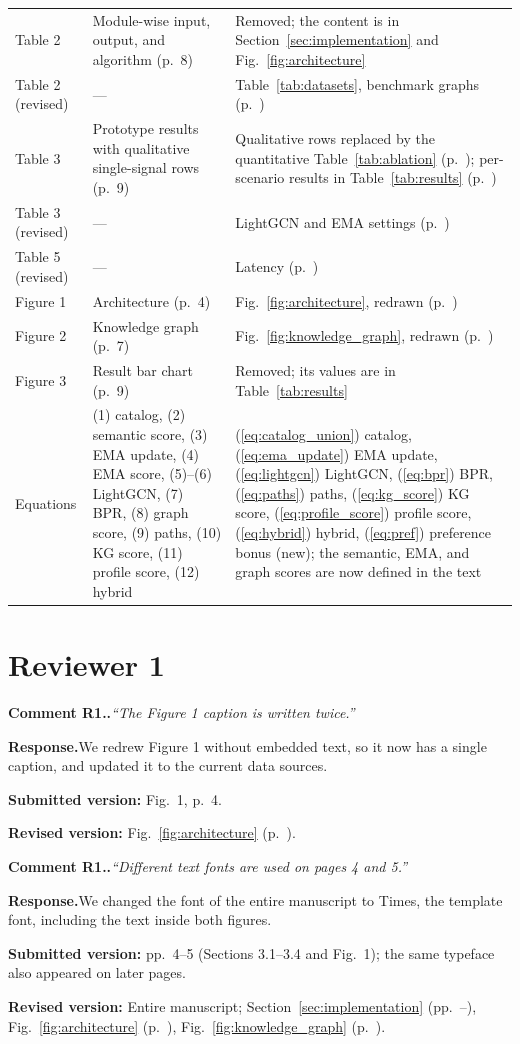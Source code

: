 \documentclass[10pt]{article}
\newcounter{rc}
\newcommand{\reviewer}[1]{\setcounter{rc}{0}\section*{Reviewer #1}}
\newcommand{\point}[2]{\stepcounter{rc}%
  \par\medskip\noindent\textbf{Comment #1.\arabic{rc}.}\enspace\textit{``#2''}\par}
\newcommand{\response}{\noindent\textbf{Response.}\enspace}
\newcommand{\where}[2]{\par\noindent\textbf{Submitted version:} #1\par\noindent\textbf{Revised version:} #2\par}
\newcommand{\figr}[1]{Fig.~\ref{#1} (p.~\pageref{#1})}
\newcommand{\sn}[1]{\ref{#1}}
\newcommand{\pg}[1]{p.~\pageref{#1}}
\begin{document}
{\begin{longtable}{@{}p{3.1cm}p{5.4cm}p{7.3cm}@{}}
Table 2 & Module-wise input, output, and algorithm (p.~8) & Removed; the content is in Section~\sn{sec:implementation} and Fig.~\ref{fig:architecture} \\
Table 2 (revised) & --- & Table~\ref{tab:datasets}, benchmark graphs (\pg{tab:datasets}) \\
Table 3 & Prototype results with qualitative single-signal rows (p.~9) & Qualitative rows replaced by the quantitative Table~\ref{tab:ablation} (\pg{tab:ablation}); per-scenario results in Table~\ref{tab:results} (\pg{tab:results}) \\
Table 3 (revised) & --- & LightGCN and EMA settings (\pg{tab:settings}) \\
Table 5 (revised) & --- & Latency (\pg{tab:latency}) \\
\midrule
Figure 1 & Architecture (p.~4) & Fig.~\ref{fig:architecture}, redrawn (\pg{fig:architecture}) \\
Figure 2 & Knowledge graph (p.~7) & Fig.~\ref{fig:knowledge_graph}, redrawn (\pg{fig:knowledge_graph}) \\
Figure 3 & Result bar chart (p.~9) & Removed; its values are in Table~\ref{tab:results} \\
\midrule
Equations & (1) catalog, (2) semantic score, (3) EMA update, (4) EMA score, (5)--(6) LightGCN, (7) BPR, (8) graph score, (9) paths, (10) KG score, (11) profile score, (12) hybrid & (\ref{eq:catalog_union}) catalog, (\ref{eq:ema_update}) EMA update, (\ref{eq:lightgcn}) LightGCN, (\ref{eq:bpr}) BPR, (\ref{eq:paths}) paths, (\ref{eq:kg_score}) KG score, (\ref{eq:profile_score}) profile score, (\ref{eq:hybrid}) hybrid, (\ref{eq:pref}) preference bonus (new); the semantic, EMA, and graph scores are now defined in the text \\
\bottomrule
\end{longtable}
}

\reviewer{1}

\point{R1}{The Figure 1 caption is written twice.}
\response We redrew Figure 1 without embedded text, so it now has a single caption, and updated it to the current data sources.
\where{Fig.~1, p.~4.}{\figr{fig:architecture}.}

\point{R1}{Different text fonts are used on pages 4 and 5.}
\response We changed the font of the entire manuscript to Times, the template font, including the text inside both figures.
\where{pp.~4--5 (Sections 3.1--3.4 and Fig.~1); the same typeface also appeared on later pages.}{Entire manuscript; Section~\ref{sec:implementation} (pp.~\pageref{sec:implementation}--\pageref{sec:hybrid}), \figr{fig:architecture}, \figr{fig:knowledge_graph}.}
\end{document}

